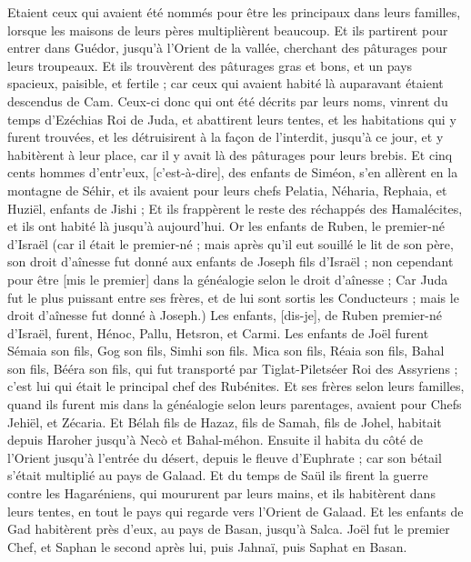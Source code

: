 \begin{multicols}{2}
Etaient ceux qui avaient été nommés pour être les principaux dans leurs familles, lorsque les maisons de leurs pères multiplièrent beaucoup.
Et ils partirent pour entrer dans Guédor, jusqu'à l'Orient de la vallée, cherchant des pâturages pour leurs troupeaux.
Et ils trouvèrent des pâturages gras et bons, et un pays spacieux, paisible, et fertile ; car ceux qui avaient habité là auparavant étaient descendus de Cam.
Ceux-ci donc qui ont été décrits par leurs noms, vinrent du temps d'Ezéchias Roi de Juda, et abattirent leurs tentes, et les habitations qui y furent trouvées, et les détruisirent à la façon de l'interdit, jusqu'à ce jour, et y habitèrent à leur place, car il y avait là des pâturages pour leurs brebis.
Et cinq cents hommes d'entr'eux, [c'est-à-dire], des enfants de Siméon, s'en allèrent en la montagne de Séhir, et ils avaient pour leurs chefs Pelatia, Néharia, Rephaia, et Huziël, enfants de Jishi ;
Et ils frappèrent le reste des réchappés des Hamalécites, et ils ont habité là jusqu'à aujourd'hui.
\VerseOne{}Or les enfants de Ruben, le premier-né d'Israël (car il était le premier-né ; mais après qu'il eut souillé le lit de son père, son droit d'aînesse fut donné aux enfants de Joseph fils d'Israël ; non cependant pour être [mis le premier] dans la généalogie selon le droit d'aînesse ;
Car Juda fut le plus puissant entre ses frères, et de lui sont sortis les Conducteurs ; mais le droit d'aînesse fut donné à Joseph.)
Les enfants, [dis-je], de Ruben premier-né d'Israël, furent, Hénoc, Pallu, Hetsron, et Carmi.
Les enfants de Joël furent Sémaia son fils, Gog son fils, Simhi son fils.
Mica son fils, Réaia son fils, Bahal son fils,
Bééra son fils, qui fut transporté par Tiglat-Piletséer Roi des Assyriens ; c'est lui qui était le principal chef des Rubénites.
Et ses frères selon leurs familles, quand ils furent mis dans la généalogie selon leurs parentages, avaient pour Chefs Jehiël, et Zécaria.
Et Bélah fils de Hazaz, fils de Samah, fils de Johel, habitait depuis Haroher jusqu'à Necò et Bahal-méhon.
Ensuite il habita du côté de l'Orient jusqu'à l'entrée du désert, depuis le fleuve d'Euphrate ; car son bétail s'était multiplié au pays de Galaad.
Et du temps de Saül ils firent la guerre contre les Hagaréniens, qui moururent par leurs mains, et ils habitèrent dans leurs tentes, en tout le pays qui regarde vers l'Orient de Galaad.
Et les enfants de Gad habitèrent près d'eux, au pays de Basan, jusqu'à Salca.
Joël fut le premier Chef, et Saphan le second après lui, puis Jahnaï, puis Saphat en Basan.

\end{multicols}
